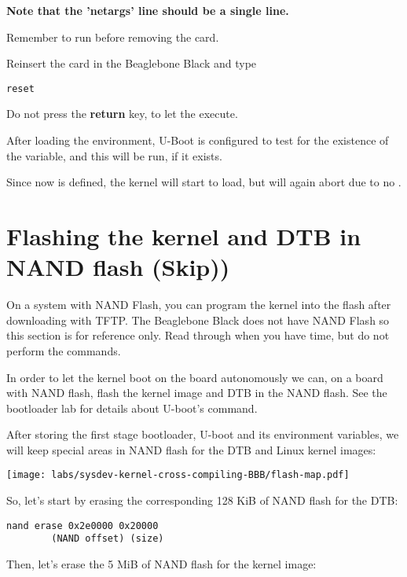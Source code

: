 {\bf Note that the ’netargs’ line should be a single line.}

Remember to run  before removing the card.

Reinsert the card in the Beaglebone Black and type

\begin{verbatim}
reset
\end{verbatim}

Do not press the {\bf return} key, to let the  execute.

After loading the  environment, U-Boot is configured to test for
the existence of the  variable, and this will be run, if it exists.

Since  now is defined, the kernel will start to load, but will again abort due to no .

\clearpage
\section{Flashing the kernel and DTB in NAND flash (Skip))}

On a system with NAND Flash, you can program the kernel into the flash
after downloading with TFTP. The Beaglebone Black does not have NAND Flash
so this section is for reference only. Read through when you have time, 
but do not perform the commands.

In order to let the kernel boot on the board autonomously we can,
on a board with NAND flash, flash the kernel image and DTB in the NAND flash. 
See the bootloader lab for details about U-boot's  command.

After storing the first stage bootloader, U-boot and its environment
variables, we will keep special areas in NAND flash for the DTB
and Linux kernel images:

\begin{center}
  \texttt{[image: labs/sysdev-kernel-cross-compiling-BBB/flash-map.pdf]}
\end{center}

So, let's start by erasing the corresponding 128 KiB of NAND flash
for the DTB:

\begin{verbatim}
nand erase 0x2e0000 0x20000
        (NAND offset) (size)
\end{verbatim}

Then, let's erase the 5 MiB of NAND flash for the kernel image:

